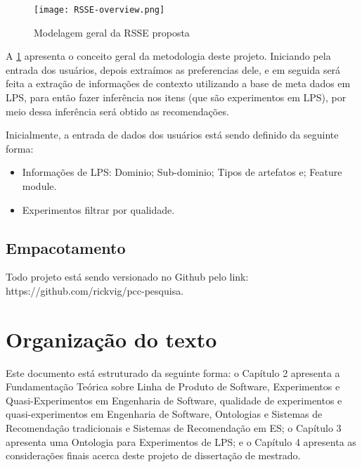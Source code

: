 \begin{figure}[htb]
	\centering					
	{\texttt{[image: RSSE-overview.png]}}
	
	\caption{Modelagem geral da RSSE proposta}
	\label{fig:RSSE-overview}
\end{figure}

A \ref{fig:RSSE-overview} apresenta o conceito geral da metodologia deste projeto. Iniciando pela entrada dos usuários, depois extraímos as preferencias dele, e em seguida será feita a extração de informações de contexto utilizando a base de meta dados em LPS, para então fazer inferência nos itens (que são experimentos em LPS), por meio dessa inferência será obtido as recomendações.

Inicialmente, a entrada de dados dos usuários está sendo definido da seguinte forma:

\begin{itemize}
	\item Informações de LPS:
	\subitem Dominio;
	\subitem Sub-dominio;
	\subitem Tipos de artefatos e;
	\subitem Feature module.
	\item Experimentos
	\subitem filtrar por qualidade.
\end{itemize}

\subsection{Empacotamento}

Todo projeto está sendo versionado no Github pelo link: https://github.com/rickvig/pcc-pesquisa.


\section{Organização do texto}

Este documento está estruturado da seguinte forma: o Capítulo 2 apresenta a Fundamentação Teórica sobre Linha de Produto de Software, Experimentos e Quasi-Experimentos em Engenharia de Software, qualidade de experimentos e quasi-experimentos em Engenharia de Software, Ontologias e Sistemas de Recomendação tradicionais e Sistemas de Recomendação em ES; o Capítulo 3 apresenta uma Ontologia para Experimentos de LPS; e o Capítulo 4 apresenta as considerações finais acerca deste projeto de dissertação de mestrado.


